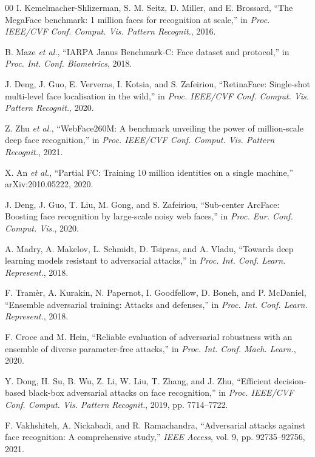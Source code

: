 \documentclass[conference]{IEEEtran}
\begin{document}
\begin{thebibliography}{00}
 I. Kemelmacher-Shlizerman, S. M. Seitz, D. Miller, and
E. Brossard, ``The MegaFace benchmark: 1 million faces for recognition at
scale,'' in \emph{Proc. IEEE/CVF Conf. Comput. Vis. Pattern Recognit.}, 2016.

 B. Maze \emph{et al.}, ``IARPA Janus Benchmark-C: Face dataset
and protocol,'' in \emph{Proc. Int. Conf. Biometrics}, 2018.

 J. Deng, J. Guo, E. Ververas, I. Kotsia, and
S. Zafeiriou, ``RetinaFace: Single-shot multi-level face localisation in the
wild,'' in \emph{Proc. IEEE/CVF Conf. Comput. Vis. Pattern Recognit.}, 2020.

 Z. Zhu \emph{et al.}, ``WebFace260M: A benchmark
unveiling the power of million-scale deep face recognition,'' in \emph{Proc.
IEEE/CVF Conf. Comput. Vis. Pattern Recognit.}, 2021.

 X. An \emph{et al.}, ``Partial FC: Training 10 million
identities on a single machine,'' arXiv:2010.05222, 2020.

 J. Deng, J. Guo, T. Liu, M. Gong, and S. Zafeiriou,
``Sub-center ArcFace: Boosting face recognition by large-scale noisy web
faces,'' in \emph{Proc. Eur. Conf. Comput. Vis.}, 2020.

 A. Madry, A. Makelov, L. Schmidt, D. Tsipras, and A. Vladu,
``Towards deep learning models resistant to adversarial attacks,'' in
\emph{Proc. Int. Conf. Learn. Represent.}, 2018.

 F. Tram\`er, A. Kurakin, N. Papernot, I. Goodfellow,
D. Boneh, and P. McDaniel, ``Ensemble adversarial training: Attacks and
defenses,'' in \emph{Proc. Int. Conf. Learn. Represent.}, 2018.

 F. Croce and M. Hein, ``Reliable evaluation of
adversarial robustness with an ensemble of diverse parameter-free attacks,''
in \emph{Proc. Int. Conf. Mach. Learn.}, 2020.

 Y. Dong, H. Su, B. Wu, Z. Li, W. Liu, T. Zhang, and
J. Zhu, ``Efficient decision-based black-box adversarial attacks on face
recognition,'' in \emph{Proc. IEEE/CVF Conf. Comput. Vis. Pattern Recognit.},
2019, pp. 7714--7722.

 F. Vakhshiteh, A. Nickabadi, and R. Ramachandra,
``Adversarial attacks against face recognition: A comprehensive study,''
\emph{IEEE Access}, vol. 9, pp. 92735--92756, 2021.


\end{thebibliography}
\end{document}
